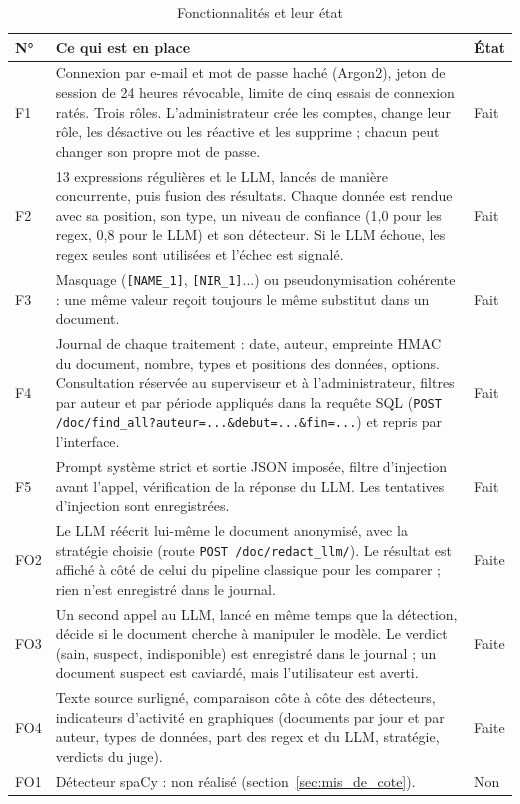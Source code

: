 \documentclass[12pt,a4paper]{article}
\begin{document}
\begin{table}[htbp]
    \centering
    \small
    \renewcommand{\arraystretch}{1.2}
    \begin{tabular}{p{0.9cm} p{12.2cm} p{1.1cm}}
        \toprule
        \textbf{N°} & \textbf{Ce qui est en place} & \textbf{État} \\
        \midrule
        F1 & Connexion par e-mail et mot de passe haché (Argon2), jeton de session de 24 heures révocable, limite de cinq essais de connexion ratés. Trois rôles. L'administrateur crée les comptes, change leur rôle, les désactive ou les réactive et les supprime ; chacun peut changer son propre mot de passe. & Fait \\
        F2 & 13 expressions régulières et le LLM, lancés de manière concurrente, puis fusion des résultats. Chaque donnée est rendue avec sa position, son type, un niveau de confiance (1,0 pour les regex, 0,8 pour le LLM) et son détecteur. Si le LLM échoue, les regex seules sont utilisées et l'échec est signalé. & Fait \\
        F3 & Masquage (\texttt{[NAME\_1]}, \texttt{[NIR\_1]}...) ou pseudonymisation cohérente : une même valeur reçoit toujours le même substitut dans un document. & Fait \\
        F4 & Journal de chaque traitement : date, auteur, empreinte HMAC du document, nombre, types et positions des données, options. Consultation réservée au superviseur et à l'administrateur, filtres par auteur et par période appliqués dans la requête SQL (\texttt{POST /doc/find\_all?auteur=...\&debut=...\&fin=...}) et repris par l'interface. & Fait \\
        F5 & Prompt système strict et sortie JSON imposée, filtre d'injection avant l'appel, vérification de la réponse du LLM. Les tentatives d'injection sont enregistrées. & Fait \\
        FO2 & Le LLM réécrit lui-même le document anonymisé, avec la stratégie choisie (route \texttt{POST /doc/redact\_llm/}). Le résultat est affiché à côté de celui du pipeline classique pour les comparer ; rien n'est enregistré dans le journal. & Faite \\
        FO3 & Un second appel au LLM, lancé en même temps que la détection, décide si le document cherche à manipuler le modèle. Le verdict (sain, suspect, indisponible) est enregistré dans le journal ; un document suspect est caviardé, mais l'utilisateur est averti. & Faite \\
        FO4 & Texte source surligné, comparaison côte à côte des détecteurs, indicateurs d'activité en graphiques (documents par jour et par auteur, types de données, part des regex et du LLM, stratégie, verdicts du juge). & Faite \\
        FO1 & Détecteur spaCy : non réalisé (section~\ref{sec:mis_de_cote}). & Non \\
        \bottomrule
    \end{tabular}
    \caption{Fonctionnalités et leur état}
    \label{tab:fonctionnalites}
\end{table}
\end{document}
